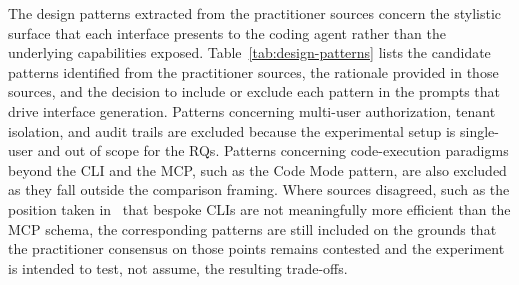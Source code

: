 \documentclass[
english,                 %
bibtex,                  %
includeExtraAbstracts, %
]{kththesis}
\numberwithin{listing}{chapter}
\begin{document}
The design patterns extracted from the practitioner sources concern the stylistic surface that each interface presents to the coding agent rather than the underlying capabilities exposed. Table~\ref{tab:design-patterns} lists the candidate patterns identified from the practitioner sources, the rationale provided in those sources, and the decision to include or exclude each pattern in the prompts that drive interface generation. Patterns concerning multi-user authorization, tenant isolation, and audit trails are excluded because the experimental setup is single-user and out of scope for the \glspl{RQ}. Patterns concerning code-execution paradigms beyond the \gls{CLI} and the \gls{MCP}, such as the Code Mode pattern, are also excluded as they fall outside the comparison framing. Where sources disagreed, such as the position taken in~\cite{chen_mcp_2026} that bespoke \glspl{CLI} are not meaningfully more efficient than the \gls{MCP} schema, the corresponding patterns are still included on the grounds that the practitioner consensus on those points remains contested and the experiment is intended to test, not assume, the resulting trade-offs.
\end{document}
